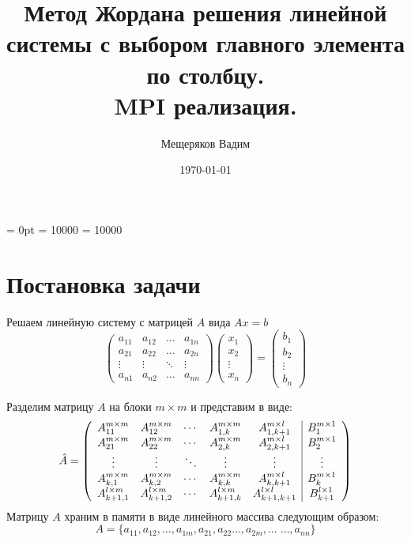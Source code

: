 \documentclass[12pt]{article} %
\author{Мещеряков Вадим}
\title{Метод Жордана решения линейной системы с выбором главного элемента по столбцу.\\ MPI реализация.}
\date{\today}
\begin{document}
\mathsurround = 0pt %
\setlength{\parindent}{0cm} %
\relpenalty = 10000
\binoppenalty = 10000

\maketitle
\section{Постановка задачи}

Решаем линейную систему с матрицей $A$ вида $Ax = b$
$$
    \begin{pmatrix}
     a_{11}& a_{12} &\ldots & a_{1n}\\
     a_{21}& a_{22} &\ldots & a_{2n}\\
     \vdots& \vdots &\ddots & \vdots\\
     a_{n1}& a_{n2} &\ldots & a_{nn}
    \end{pmatrix}
    \begin{pmatrix}
     x_1 \\
     x_2 \\
     \vdots \\
     x_n
    \end{pmatrix}
    =
    \begin{pmatrix}
     b_1 \\
     b_2 \\
     \vdots \\
     b_n
    \end{pmatrix}
$$

Разделим матрицу $A$ на блоки $m \times m$ и представим в виде:
$$\hat A=
  \left( \begin{array}{c c c c c|c}
    A_{11}^{m \times m} & A_{12}^{m \times m} & \cdots & A_{1,k}^{m \times m} & A_{1,k+1}^{m \times l} & B_1^{m \times 1} \\
    A_{21}^{m \times m} & A_{22}^{m \times m} & \cdots & A_{2,k}^{m \times m} & A_{2,k+1}^{m \times l} & B_2^{m \times 1} \\ 
    \vdots & \vdots & \ddots & \vdots & \vdots & \vdots \\ 
    A_{k,1}^{m \times m} & A_{k,2}^{m \times m} & \cdots & A_{k,k}^{m \times m} & A_{k,k+1}^{m \times l} & B_k^{m \times 1} \\
    A_{k+1,1}^{l \times m} & A_{k+1,2}^{l \times m} & \cdots & A_{k+1,k}^{l \times m} & A_{k+1,k+1}^{l \times l} & B_{k+1}^{l \times 1}
  \end{array}
  \right)
$$
Матрицу $A$ храним в памяти в виде линейного массива следующим образом:
$$A = \{a_{11},a_{12},\ldots,a_{1m},a_{21},a_{22}\ldots,a_{2m},\ldots \; \ldots,a_{nn}\}$$
\end{document}
